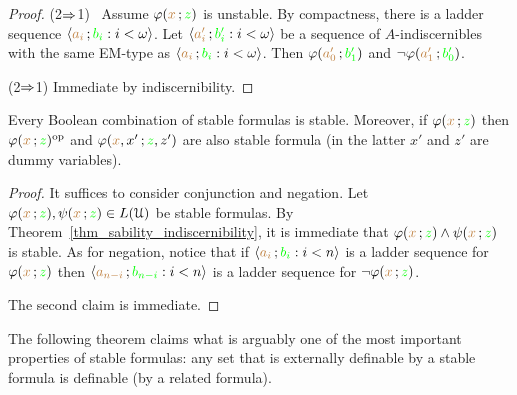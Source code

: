 \begin{proof}
  (2$\Rightarrow$1) \ Assume $\varphi({\color{brown} x}\,;{\color{green} z})$ is unstable.
  By compactness, there is a ladder sequence $\langle{\color{brown}a_i}\,;{\color{green} b_i} : i<\omega\rangle$.
  Let $\langle{\color{brown}a'_i}\,;{\color{green} b'_i} : i<\omega\rangle$ be a sequence of $A$-indiscernibles with the same EM-type as $\langle{\color{brown}a_i}\,;{\color{green} b_i} : i<\omega\rangle$.
  Then $\varphi({\color{brown} a'_0}\,;{\color{green} b'_1})$ and $\neg\varphi({\color{brown} a'_1}\,;{\color{green} b'_0})$.

  (2$\Rightarrow$1) Immediate by indiscernibility.
\end{proof}


\begin{lemma}\label{lem_stab_Boole}
  Every Boolean combination of stable formulas is stable.
  Moreover, if $\varphi({\color{brown} x}\,;{\color{green} z})$ then  $\varphi({\color{brown} x}\,;{\color{green} z})^{\rm op}$ and $\varphi({\color{brown} x},x'\,;{\color{green} z},z')$ are also stable formula (in the latter $x'$ and $z'$ are dummy variables).
\end{lemma}

\begin{proof}
  It suffices to consider conjunction and negation.
  Let $\varphi({\color{brown} x}\,;{\color{green} z}),\psi({\color{brown} x}\,;{\color{green} z})\in L(\EuScript U)$ be stable formulas.
  By Theorem~\ref{thm_sability_indiscernibility}, it is immediate that $\varphi({\color{brown} x}\,;{\color{green} z})\wedge\psi({\color{brown} x}\,;{\color{green} z})$ is stable.
  As for negation, notice that if $\langle{\color{brown}a_i}\,;{\color{green} b_i} : i<n\rangle$ is a ladder sequence for $\varphi({\color{brown} x}\,;{\color{green} z})$ then  $\langle{\color{brown}a_{n-i}}\,;{\color{green} b_{n-i}} : i<n\rangle$ is a ladder sequence for $\neg\varphi({\color{brown} x}\,;{\color{green} z})$.

  The second claim is immediate.
\end{proof}

The following theorem claims what is arguably one of the most important properties of stable formulas: any set that is externally definable by a stable formula is definable (by a related formula).

